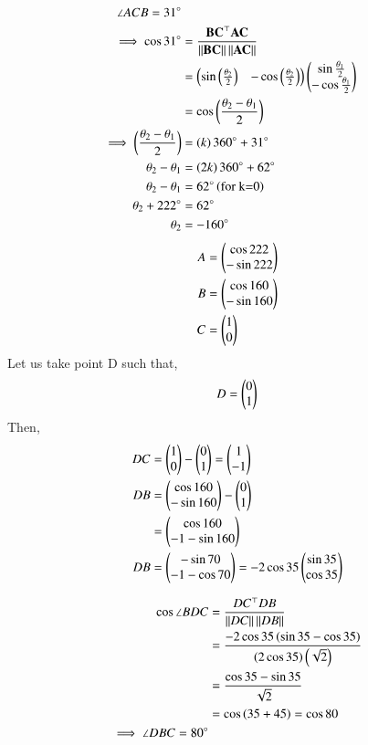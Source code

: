 \documentclass[journal,12pt,twocolumn]{IEEEtran}
\begin{document}
\begin{enumerate}
		\begin{align}
			\angle ACB = 31 \degree \\
			\implies \cos 31 \degree &=  \frac{\mathbf{BC}^{\top}\mathbf{AC}}{\left\lVert\mathbf{BC}\right\rVert\left\lVert\mathbf{AC}\right\rVert}\\ 
						 &= \begin{pmatrix}\sin \left(\frac{\theta_2}{2}\right)&-\cos \left(\frac{\theta_2}{2}\right)\end{pmatrix}\begin{pmatrix}\sin \frac{\theta_1}{2} \\ -\cos \frac{\theta_1}{2}\end{pmatrix}\\
						 &= \cos \left(\frac{\theta_2-\theta_1}{2}\right)\\
			\implies \left(\frac{\theta_2-\theta_1}{2}\right) &= \left(k\right)360\degree +31\degree\\
			       \theta_2-\theta_1 &= \left(2k\right)360\degree + 62\degree\\ 
			       \theta_2-\theta_1 &= 62\degree \left(\text{for k=0}\right)\\
			       \theta_2+222\degree &= 62\degree\\
			       \theta_2 &= -160\degree 
		\end{align}
		\begin{align}
			A &= \begin{pmatrix}\cos 222\\ -\sin 222\end{pmatrix}\\
			B &= \begin{pmatrix}\cos 160\\ -\sin 160\end{pmatrix}\\
			C &= \begin{pmatrix}1\\0\end{pmatrix}
		\end{align}
		Let us take point D such that,
		\begin{align}
			D = \begin{pmatrix}0\\1\end{pmatrix}
		\end{align}
		Then,
		\begin{align}
			DC &= \begin{pmatrix}1\\0\end{pmatrix}-\begin{pmatrix}0\\1\end{pmatrix} = \begin{pmatrix}1\\-1\end{pmatrix}\\
			DB &= \begin{pmatrix}\cos 160\\ -\sin 160\end{pmatrix} - \begin{pmatrix}0\\1\end{pmatrix}\\
			   &= \begin{pmatrix}\cos 160\\ -1-\sin 160\end{pmatrix}\\
			DB &= \begin{pmatrix}-\sin 70\\ -1-\cos 70\end{pmatrix} = -2\cos 35 \begin{pmatrix}\sin 35\\ \cos35\end{pmatrix}
		\end{align}
	
		\begin{align}
			\cos \angle BDC &= \frac{DC^{\top}DB}{\left\lVert DC\right\rVert\left\lVert DB\right\rVert}\\
					&= \frac{-2\cos 35 \left(\sin 35 - \cos 35\right)}{\left(2\cos 35\right)\left(\sqrt{2}\right)}\\
					&= \frac{\cos 35 - \sin 35}{\sqrt{2}}\\
					&= \cos \left(35+45\right) = \cos 80\\
			\implies \angle DBC = 80 \degree
		\end{align}

\end{enumerate}
\end{document}
